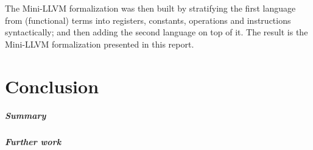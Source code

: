 \documentclass[a4paper, oneside, 10pt, draft]{memoir}
\begin{document}
The Mini-LLVM formalization was then built by stratifying the first
language from (functional) terms into registers, constants, operations
and instructions syntactically; and then adding the second language on
top of it. The result is the Mini-LLVM formalization presented in this
report.

\chapter{Conclusion}

\paragraph{Summary}
\paragraph{Further work}



\end{document}
